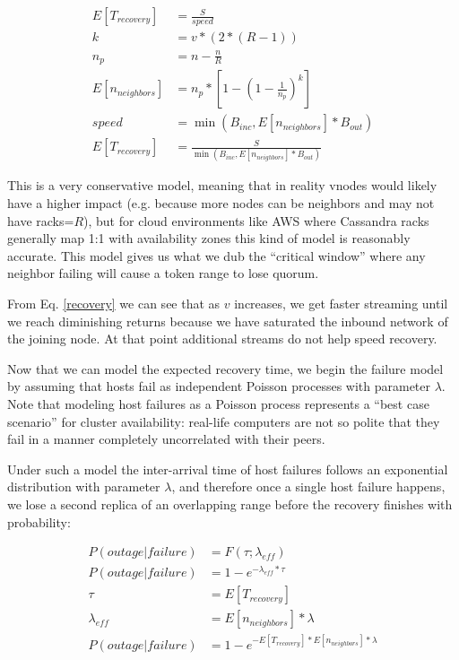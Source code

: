 \documentclass{article}
\begin{document}
\begin{subequations} \label{recovery}
    \begin{align}
        E[T_{recovery}] & = \frac{S}{speed} \\
        \label{eq:recoveryb}
        k & = v * (2 * (R - 1)) \\
        \label{eq:recoveryc}
        n_{p} & = n - \frac{n}{R} \\
        \label{eq:recoveryd}
        E[n_{neighbors}] & = n_{p} * [1 - (1-\frac{1}{n_{p}})^k] \\
        \label{eq:recoverye}
        speed & = \min(B_{inc}, E[n_{neighbors}] * B_{out}) \\
        \label{eq:recoveryf}
        E[T_{recovery}] & = \frac{S}{\min(B_{inc}, E[n_{neighbors}] * B_{out})}
    \end{align}
\end{subequations}

This is a very conservative model, meaning that in reality vnodes would likely
have a higher impact (e.g. because more nodes can be neighbors and may not
have racks=$R$), but for cloud environments like AWS where Cassandra racks
generally map 1:1 with availability zones this kind of model is reasonably
accurate. This model gives us what we dub the ``critical window'' where any
neighbor failing will cause a token range to lose quorum.

From Eq. \ref{recovery} we can see that as $v$ increases, we get faster
streaming until we reach diminishing returns because we have saturated the
inbound network of the joining node. At that point additional streams do not
help speed recovery.

Now that we can model the expected recovery time, we begin the failure model by
assuming that hosts fail as independent Poisson processes with parameter
$\lambda$. Note that modeling host failures as a Poisson process represents a
``best case scenario'' for cluster availability: real-life computers are not so
polite that they fail in a manner completely uncorrelated with their peers.

Under such a model the inter-arrival time of host failures follows an
exponential distribution with parameter $\lambda$, and therefore once a single
host failure happens, we lose a second replica of an overlapping range before
the recovery finishes with probability:

\begin{subequations} \label{avail}
\begin{align}
        P(outage|failure) & = F(\tau; \lambda_{eff}) \\ \label{availa}
        P(outage|failure) & = 1 - e^{-\lambda_{eff} * \tau} \\ \label{availb}
        \tau & = E[T_{recovery}] \\ \label{availc}
        \lambda_{eff} & = E[n_{neighbors}] * \lambda \\ \label{availd}
        P(outage|failure) & = 1 - e^{- E[T_{recovery}] * E[n_{neighbors}] * \lambda}
\end{align}
\end{subequations}
\end{document}
